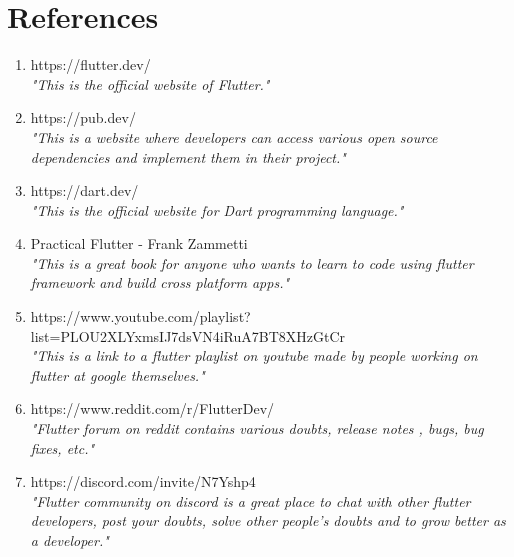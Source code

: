 \documentclass[12pt,a4wide]{report}
\theoremstyle{plain}
\theoremstyle{definition}
\theoremstyle{remark}
\begin{document}
\chapter{References}
\begin{enumerate}

\item https://flutter.dev/\\
{\em "This is the official website of Flutter."}

\item https://pub.dev/\\
{\em "This is a website where developers can access various open source dependencies and implement them in their project."}

\item https://dart.dev/\\
{\em "This is the official website for Dart programming language."}

\item Practical Flutter - Frank Zammetti\\
{\em "This is a great book for anyone who wants to learn to code using flutter framework and build cross platform apps."}

\item https://www.youtube.com/playlist?list=PLOU2XLYxmsIJ7dsVN4iRuA7BT8XHzGtCr\\
{\em "This is a link to a flutter playlist on youtube made by people working on flutter at google themselves."}

\item https://www.reddit.com/r/FlutterDev/\\
{\em "Flutter forum on reddit contains various doubts, release notes , bugs, bug fixes, etc."}

\item https://discord.com/invite/N7Yshp4\\
{\em "Flutter community on discord is a great place to chat with other flutter developers, post your doubts, solve other people's doubts and to grow better as a developer."}

\end{enumerate}
\end{document}
